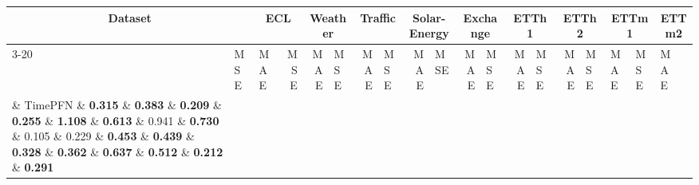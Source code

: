 
\begin{table*}[t]
\centering
\small
\setlength{\tabcolsep}{0.6mm}
\begin{tabular}{ll|lr|rl|rl|rl|rl|rl|rl|ll|ll}
\hline
\multicolumn{2}{c|}{Dataset} & \multicolumn{2}{c|}{ECL} & \multicolumn{2}{c|}{Weather} & \multicolumn{2}{c|}{Traffic} & \multicolumn{2}{c|}{Solar-Energy} & \multicolumn{2}{c|}{Exchange} & \multicolumn{2}{c|}{ETTh1} & \multicolumn{2}{c|}{ETTh2} & \multicolumn{2}{c|}{ETTm1} & \multicolumn{2}{c}{ETTm2} \\ \cline{3-20} 
\multicolumn{2}{c|}{Models} & MSE & MAE & MSE & MAE & MSE & MAE & MSE & MAE & MSE & MAE & MSE & MAE & MSE & MAE & MSE & MAE & MSE & MAE \\ \hline
\parbox[t]{2mm}{} & TimePFN & \textbf{0.315} & \textbf{0.383} & \textbf{0.209} & \textbf{0.255} & \textbf{1.108} & \textbf{0.613} & 0.941 & \textbf{0.730} & 0.105 & 0.229 & \textbf{0.453} & \textbf{0.439} & \textbf{0.328} & \textbf{0.362} & \textbf{0.637} & \textbf{0.512} & \textbf{0.212}  & \textbf{0.291} \\
 & Naive & 1.587 & 0.945 & 0.259 & 0.254 & 2.714 & 1.077 & 1.539 & 0.815 & \textbf{0.081} & \textbf{0.196} & 1.294 & 0.713 & 0.431 & 0.421  & 1.213 & 0.664 & 0.266 & 0.327 \\ 
  & SeasonalNaive & 1.618 & 0.964 & 0.268 & 0.263 & 2.774 & 1.097 & 1.599 & 0.844 & 0.086 & 0.204 & 1.325 & 0.727 & 0.445 & 0.431  & 1.227 & 0.673 & 0.274 & 0.334 \\ 
  & Mean & 0.845 & 0.761 & 0.215 & 0.271 & 1.410 & 0.804 & \textbf{0.910} & 0.734 & 0.139 & 0.269 & 0.700 & 0.558 & 0.352 & 0.387 & 0.693 & 0.547 & 0.229 & 0.307 \\ \hline \hline
\parbox[t]{2mm}{} & TimePFN & \textbf{0.235} & \textbf{0.322} & \textbf{0.190} & \textbf{0.235} & \textbf{0.746} & \textbf{0.468} & \textbf{0.429} & \textbf{0.450} & \textbf{0.096} & \textbf{0.218}  & \textbf{0.438} & \textbf{0.429} & \textbf{0.324} & \textbf{0.359} &  \textbf{0.419} & \textbf{0.418} & \textbf{0.195} & \textbf{0.276} \\
 & iTransformer & 0.278 & 0.360 & 0.237 & 0.278 & 0.801 & 0.499 & 0.513 & 0.479  & 0.145 & 0.275 & 0.838 & 0.617 & 0.410 & 0.422  & 0.884   & 0.608  & 0.268 & 0.337 \\
 & PatchTST & 0.667 & 0.646 & 0.221 & 0.269 & 1.295 & 0.746 & 0.810 & 0.669 & 0.127 & 0.255 & 0.778 & 0.587 & 0.372 & 0.401 & 0.656 & 0.528 & 0.231 & 0.310 \\

\end{tabular}
\end{table*}
